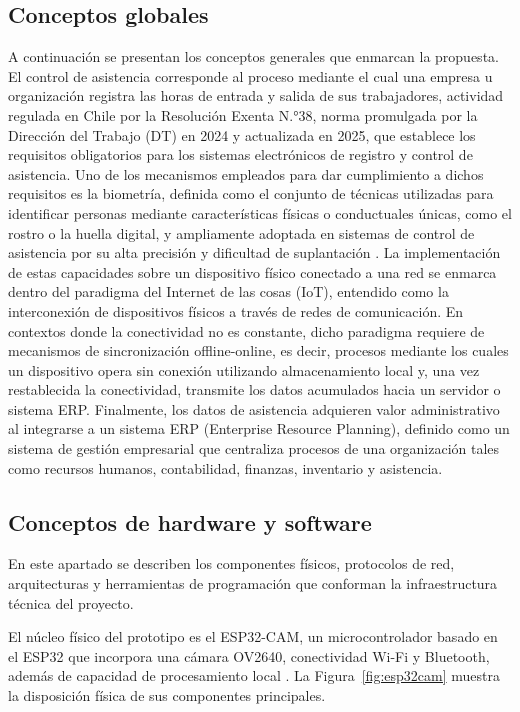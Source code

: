 \documentclass{iccmemoria}
\begin{document}
\subsection{Conceptos globales}
A continuación se presentan los conceptos generales que enmarcan la propuesta. El control de asistencia corresponde al proceso mediante el cual una empresa u organización registra las horas de entrada y salida de sus trabajadores, actividad regulada en Chile por la Resolución Exenta N.°38, norma promulgada por la Dirección del Trabajo (DT) en 2024 y actualizada en 2025, que establece los requisitos obligatorios para los sistemas electrónicos de registro y control de asistencia. Uno de los mecanismos empleados para dar cumplimiento a dichos requisitos es la biometría, definida como el conjunto de técnicas utilizadas para identificar personas mediante características físicas o conductuales únicas, como el rostro o la huella digital, y ampliamente adoptada en sistemas de control de asistencia por su alta precisión y dificultad de suplantación \cite{kaspersky_biometria}. La implementación de estas capacidades sobre un dispositivo físico conectado a una red se enmarca dentro del paradigma del Internet de las cosas (IoT), entendido como la interconexión de dispositivos físicos a través de redes de comunicación. En contextos donde la conectividad no es constante, dicho paradigma requiere de mecanismos de sincronización offline-online, es decir, procesos mediante los cuales un dispositivo opera sin conexión utilizando almacenamiento local y, una vez restablecida la conectividad, transmite los datos acumulados hacia un servidor o sistema ERP. Finalmente, los datos de asistencia adquieren valor administrativo al integrarse a un sistema ERP (Enterprise Resource Planning), definido como un sistema de gestión empresarial que centraliza procesos de una organización tales como recursos humanos, contabilidad, finanzas, inventario y asistencia.
\subsection{Conceptos de hardware y software}
En este apartado se describen los componentes físicos, protocolos de red, arquitecturas y herramientas de programación que conforman la infraestructura técnica del proyecto.

El núcleo físico del prototipo es el ESP32-CAM, un microcontrolador basado en el ESP32 que incorpora una cámara OV2640, conectividad Wi-Fi y Bluetooth, además de capacidad de procesamiento local \cite{ubidots_esp32cam}. La Figura~\ref{fig:esp32cam} muestra la disposición física de sus componentes principales.
\end{document}
